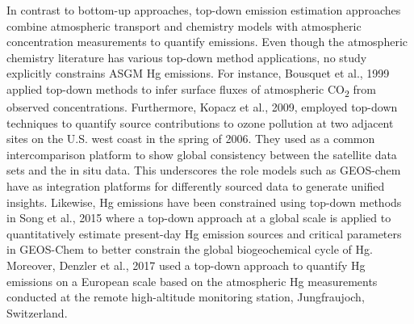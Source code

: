 \begin{flushleft}
In contrast to bottom-up approaches, top-down emission estimation approaches combine atmospheric transport and chemistry models with atmospheric concentration measurements to quantify emissions. Even though the atmospheric chemistry literature has various top-down method applications, no study explicitly constrains ASGM Hg emissions. For instance, Bousquet et al., 1999 applied top-down methods to infer surface fluxes of atmospheric CO\textsubscript{2} from observed concentrations\cite{bousquet_inverse_1999}. Furthermore, Kopacz et al., 2009, employed top-down techniques to quantify source contributions to ozone pollution at two adjacent sites on the U.S. west coast in the spring of 2006\cite{kopacz_global_2010}. They used  \gc as a common intercomparison platform to show global consistency between the satellite data sets and the in situ data. This underscores the role models such as GEOS-chem have as integration platforms for differently sourced data to generate unified insights. Likewise, Hg emissions have been constrained using top-down methods in Song et al., 2015 where a top-down approach at a global scale is applied to quantitatively estimate present-day Hg emission sources and critical parameters in GEOS-Chem to better constrain the global biogeochemical cycle of Hg\cite{song_top-down_2015}. Moreover, Denzler et al., 2017 used a top-down approach to quantify Hg emissions on a European scale based on the atmospheric Hg measurements conducted at the remote high-altitude monitoring station, Jungfraujoch, Switzerland\cite{denzler_inversion_2017}. 
\end{flushleft}


